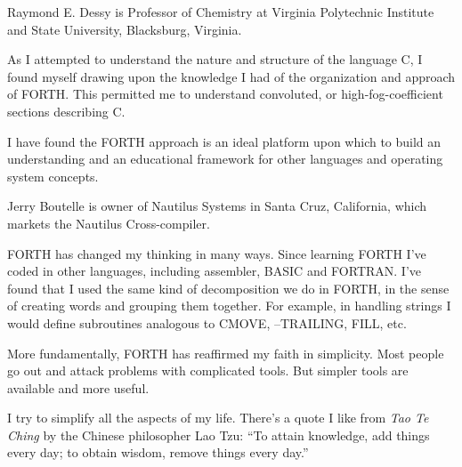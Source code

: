 Raymond E. Dessy is Professor of Chemistry at Virginia Polytechnic Institute
and State University, Blacksburg, Virginia.
\begin{tfquot}
As I attempted to understand the nature and structure of the language C, I 
found myself drawing upon the knowledge I had of the organization and
approach of FORTH.  This permitted me to understand convoluted, or
high-fog-coefficient sections describing C.

I have found the FORTH approach is an ideal platform upon which to build
an understanding and an educational framework for other languages and
operating system concepts.
\end{tfquot}
Jerry Boutelle is owner of Nautilus Systems in Santa Cruz, California, 
which markets the Nautilus Cross-compiler.
\begin{tfquot}
FORTH has changed my thinking in many ways.  Since learning FORTH 
I've coded in other languages, including assembler, BASIC and FORTRAN.
I've found that I used the same kind of decomposition we do in
FORTH, in the sense of creating words and grouping them together.  For
example, in handling strings I would define subroutines analogous to
CMOVE, --TRAILING, FILL, etc.

More fundamentally, FORTH has reaffirmed my faith in simplicity.  Most 
people go out and attack problems with complicated tools.  But simpler
tools are available and more useful.

I try to simplify all the aspects of my life.  There's a quote I like
from {\em Tao Te Ching}
by the Chinese philosopher Lao Tzu: ``To attain knowledge, add 
things every day; to obtain wisdom, remove things every day.''
\end{tfquot}
